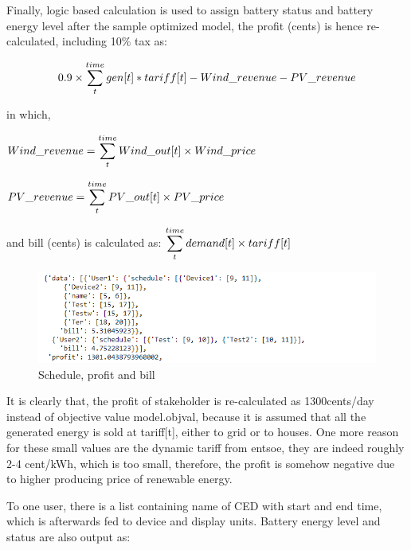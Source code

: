 \documentclass[runningheads]{llncs}
\begin{document}
Finally, logic based calculation is used to assign battery status and battery energy level after the sample optimized model, the profit (cents) is hence re-calculated, including 10\% tax as: 

\[\displaystyle 0.9 \times \sum_{t}^{\\time} gen[t]*tariff[t] - Wind\_revenue - PV\_revenue\]

in which, 

$\displaystyle Wind\_revenue = \sum_{t}^{\\time} Wind\_out[t] \times Wind\_price$

$\displaystyle PV\_revenue = \sum_{t}^{\\time} PV\_out[t] \times PV\_price$

and bill (cents) is calculated as:
$\displaystyle \sum_{t}^{\\time} demand[t] \times tariff[t]$
\begin{figure}[H]
	\centering
	\includegraphics[width=0.9\columnwidth]{optimization2.PNG}
	\caption{Schedule, profit and bill}
	\label{img:profit_bill}
\end{figure}

It is clearly that, the profit of stakeholder is re-calculated as 1300cents/day instead of objective value model.objval, because it is assumed that all the generated energy is sold at tariff[t], either to grid or to houses. One more reason for these small values are the dynamic tariff from entsoe, they are indeed roughly 2-4 cent/kWh, which is too small, therefore, the profit is somehow negative due to higher producing price of renewable energy. 

To one user, there is a list containing name of CED with start and end time, which is afterwards fed to device and display units. Battery energy level and status are also output as: 
\end{document}
